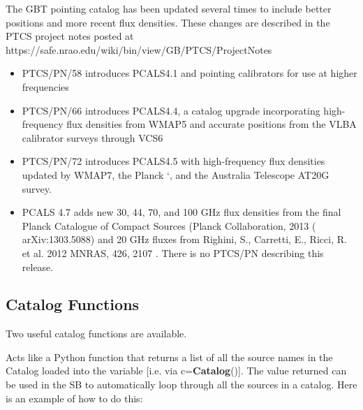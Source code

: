\newpage

The GBT pointing catalog has been updated several times to  include
better positions and more recent flux densities.  These changes are
described in the PTCS project notes posted at \newline
{}
{https://safe.nrao.edu/wiki/bin/view/GB/PTCS/ProjectNotes}

\begin{itemize}[leftmargin=*]
\item PTCS/PN/58 introduces PCALS4.1 and  pointing 
calibrators for use at higher frequencies

\item PTCS/PN/66 introduces PCALS4.4, a catalog upgrade incorporating 
high-frequency flux densities from WMAP5 and accurate positions from the 
VLBA calibrator surveys through VCS6

\item PTCS/PN/72 introduces PCALS4.5 with high-frequency flux densities 
updated by WMAP7, the Planck `, and 
the Australia Telescope AT20G survey.

\item PCALS 4.7 adds new 30, 44, 70, and 100 GHz flux densities from the 
final Planck Catalogue of Compact Sources (Planck Collaboration, 2013 
( arXiv:1303.5088) and 20 GHz fluxes from Righini, S., Carretti, E., 
Ricci, R. et al. 2012 MNRAS, 426, 2107 .  
There is no PTCS/PN describing this release.

\end{itemize}




\subsection{Catalog Functions}
Two useful catalog functions are available.


Acts like a Python function that returns a list of all the source names
in the Catalog loaded into the variable  [i.e. via
c={\bfseries{\textcolor{pythonKeywords}{Catalog}}}()].
The value returned can be used in the \gls{SB} to automatically loop
through all the sources in a catalog.  Here is an example of how to do this:

